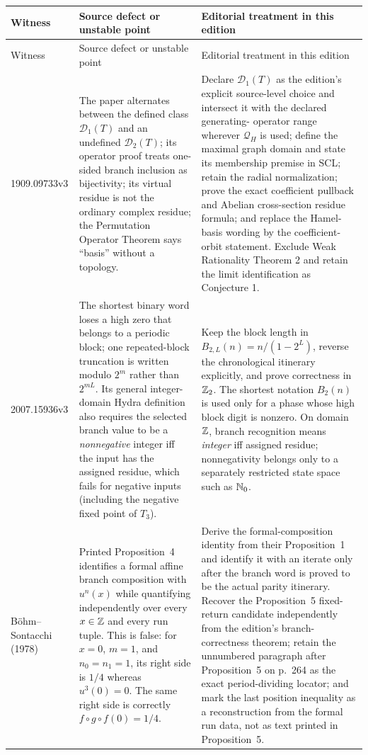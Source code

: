 \begingroup\small
\setlength{\tabcolsep}{3pt}
\begin{longtable}{@{}p{}p{}p{}@{}}
\toprule
Witness & Source defect or unstable point & Editorial treatment in this
edition\\
\midrule
\endfirsthead
\toprule
Witness & Source defect or unstable point & Editorial treatment in this
edition\\
\midrule
\endhead
1909.09733v3 & The paper alternates between the defined class
$\mathcal D_1(T)$ and an undefined $\mathcal D_2(T)$; its operator proof
treats one-sided branch inclusion as bijectivity; its virtual residue is not
the ordinary complex residue; the Permutation Operator Theorem says
 ``basis'' without a topology. & Declare $\mathcal D_1(T)$ as the edition's
 explicit source-level choice and intersect it with the declared generating-
operator range wherever $\mathscr Q_H$ is used; define the maximal graph
domain and state its membership premise in SCL; retain the radial
normalization; prove the exact coefficient pullback and Abelian cross-section
residue formula; and replace the Hamel-basis wording by the coefficient-orbit
statement.  Exclude Weak Rationality Theorem 2 and retain the limit
identification as Conjecture 1.\\

2007.15936v3 & The shortest binary word loses a high zero that belongs to a
periodic block; one repeated-block truncation is written modulo $2^m$ rather
than $2^{mL}$.  Its general integer-domain Hydra definition also requires
the selected branch value to be a \emph{nonnegative} integer iff the input
has the assigned residue, which fails for negative inputs (including the
negative fixed point of $T_3$). & Keep the block length in
$B_{2,L}(n)=n/(1-2^L)$, reverse the chronological itinerary explicitly, and
prove correctness in $\mathbb Z_2$.  The shortest notation $B_2(n)$ is used only
for a phase whose high block digit is nonzero.  On domain $\mathbb Z$, branch
recognition means \emph{integer} iff assigned residue; nonnegativity belongs
only to a separately restricted state space such as $\mathbb N_0$.\\

B\"ohm--Sontacchi (1978) & Printed Proposition~4 identifies a formal affine
branch composition with $u^n(x)$ while quantifying independently over every
$x\in\mathbb Z$ and every run tuple.  This is false: for
$x=0$, $m=1$, and $n_0=n_1=1$, its right side is $1/4$ whereas
$u^3(0)=0$.  The same right side is correctly
$f\circ g\circ f(0)=1/4$. & Derive the formal-composition identity from
their Proposition~1 and identify it with an iterate only after the branch
word is proved to be the actual parity itinerary.  Recover the
Proposition~5 fixed-return candidate independently from the edition's
branch-correctness theorem; retain the unnumbered paragraph after
Proposition~5 on p.~264 as the exact period-dividing locator; and mark the
last position inequality as a reconstruction from the formal run data, not
as text printed in Proposition~5.\\


\end{longtable}
